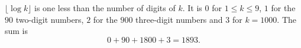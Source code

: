 \(\lfloor\log k\rfloor\) is one less than the number of digits of \(k\). It is \(0\) for \(1\le k\le 9\), \(1\) for the \(90\) two-digit numbers, \(2\) for the \(900\) three-digit numbers and \(3\) for \(k=1000\). The sum is
\[
0+90+1800+3=\boxed{1893}.
\]
